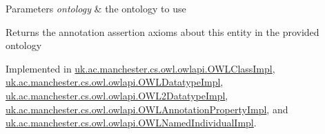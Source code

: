 \begin{DoxyParams}{Parameters}
{\em ontology} & the ontology to use \\
\hline
\end{DoxyParams}
\begin{DoxyReturn}{Returns}
the annotation assertion axioms about this entity in the provided ontology 
\end{DoxyReturn}


Implemented in \hyperlink{classuk_1_1ac_1_1manchester_1_1cs_1_1owl_1_1owlapi_1_1_o_w_l_class_impl_a468dfc132ef2638dcdadbbbb5e9763db}{uk.\-ac.\-manchester.\-cs.\-owl.\-owlapi.\-O\-W\-L\-Class\-Impl}, \hyperlink{classuk_1_1ac_1_1manchester_1_1cs_1_1owl_1_1owlapi_1_1_o_w_l_datatype_impl_aab74b0e8dc3dcc949b37afe391a9abc4}{uk.\-ac.\-manchester.\-cs.\-owl.\-owlapi.\-O\-W\-L\-Datatype\-Impl}, \hyperlink{classuk_1_1ac_1_1manchester_1_1cs_1_1owl_1_1owlapi_1_1_o_w_l2_datatype_impl_aacd06494f152f3d10ab22668d6a12f63}{uk.\-ac.\-manchester.\-cs.\-owl.\-owlapi.\-O\-W\-L2\-Datatype\-Impl}, \hyperlink{classuk_1_1ac_1_1manchester_1_1cs_1_1owl_1_1owlapi_1_1_o_w_l_annotation_property_impl_ab5d12af91fa852696173317463b68cae}{uk.\-ac.\-manchester.\-cs.\-owl.\-owlapi.\-O\-W\-L\-Annotation\-Property\-Impl}, and \hyperlink{classuk_1_1ac_1_1manchester_1_1cs_1_1owl_1_1owlapi_1_1_o_w_l_named_individual_impl_accd402aaf3d73b53b83e039d70616e6d}{uk.\-ac.\-manchester.\-cs.\-owl.\-owlapi.\-O\-W\-L\-Named\-Individual\-Impl}.


